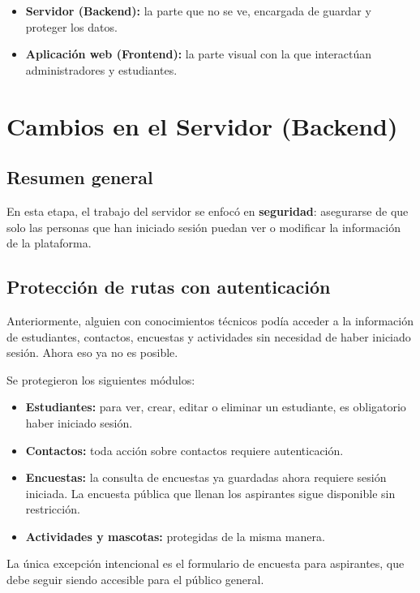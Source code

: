 \documentclass[12pt, a4paper]{article}
\begin{document}
\begin{itemize}
  \item \textbf{Servidor (Backend):} la parte que no se ve, encargada de guardar y proteger los datos.
  \item \textbf{Aplicación web (Frontend):} la parte visual con la que interactúan administradores y estudiantes.
\end{itemize}

\newpage
\section{Cambios en el Servidor (Backend)}

\subsection{Resumen general}

En esta etapa, el trabajo del servidor se enfocó en \textbf{seguridad}: asegurarse de que solo las personas que han iniciado sesión puedan ver o modificar la información de la plataforma.

\subsection{Protección de rutas con autenticación}

Anteriormente, alguien con conocimientos técnicos podía acceder a la información de estudiantes, contactos, encuestas y actividades sin necesidad de haber iniciado sesión. Ahora eso ya no es posible.

Se protegieron los siguientes módulos:

\begin{itemize}
  \item \textbf{Estudiantes:} para ver, crear, editar o eliminar un estudiante, es obligatorio haber iniciado sesión.
  \item \textbf{Contactos:} toda acción sobre contactos requiere autenticación.
  \item \textbf{Encuestas:} la consulta de encuestas ya guardadas ahora requiere sesión iniciada. La encuesta pública que llenan los aspirantes sigue disponible sin restricción.
  \item \textbf{Actividades y mascotas:} protegidas de la misma manera.
\end{itemize}

La única excepción intencional es el formulario de encuesta para aspirantes, que debe seguir siendo accesible para el público general.
\end{document}
